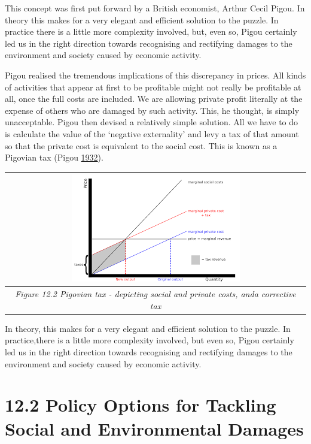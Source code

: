 \documentclass[]{tufte-handout}
\begin{document}
This concept was first put forward by a British economist, Arthur Cecil
Pigou. In theory this makes for a very elegant and efficient solution to
the puzzle. In practice there is a little more complexity involved, but,
even so, Pigou certainly led us in the right direction towards
recognising and rectifying damages to the environment and society caused
by economic activity.

Pigou realised the tremendous implications of this discrepancy in
prices. All kinds of activities that appear at first to be profitable
might not really be profitable at all, once the full costs are included.
We are allowing private profit literally at the expense of others who
are damaged by such activity. This, he thought, is simply unacceptable.
Pigou then devised a relatively simple solution. All we have to do is
calculate the value of the `negative externality' and levy a tax of that
amount so that the private cost is equivalent to the social cost. This
is known as a Pigovian tax (Pigou
\protect\hyperlink{ref-Pigou1932}{1932}).

\begin{longtable}[]{@{}c@{}}
\toprule
\begin{minipage}[b]{0.97\columnwidth}\centering
\includegraphics{ChapterPictures/9-1-PigovianTax.png}\strut
\end{minipage}\tabularnewline
\midrule
\endhead
\begin{minipage}[t]{0.97\columnwidth}\centering
\emph{Figure 12.2 Pigovian tax - depicting social and private costs,
anda corrective tax}\strut
\end{minipage}\tabularnewline
\bottomrule
\end{longtable}

In theory, this makes for a very elegant and efficient solution to the
puzzle. In practice,there is a little more complexity involved, but even
so, Pigou certainly led us in the right direction towards recognising
and rectifying damages to the environment and society caused by economic
activity.

\hypertarget{policy-options-for-tackling-social-and-environmental-damages}{%
\section{12.2 Policy Options for Tackling Social and Environmental
Damages}\label{policy-options-for-tackling-social-and-environmental-damages}}
\end{document}
